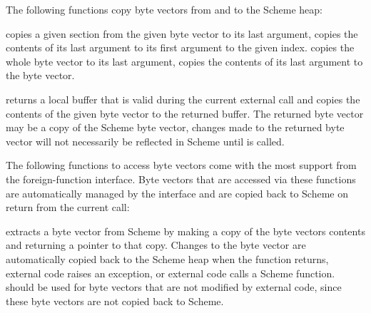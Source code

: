 The following functions copy byte vectors from and to the Scheme heap:

\begin{protos}
\end{protos}

 copies a given section
from the given byte vector to its last argument,
 copies the contents of its
last argument to its first argument to the given index.
 copies the whole byte vector
to its last argument,  copies the
contents of its last argument to the byte vector.

\begin{protos}
\end{protos}

 returns a local buffer
that is valid during the current external call and copies the contents
of the given byte vector to the returned buffer.  The returned byte
vector may be a copy of the Scheme byte vector, changes made to the
returned byte vector will not necessarily be reflected in Scheme until
 is called.

The following functions to access byte vectors come with the most
support from the foreign-function interface.  Byte vectors that are
accessed via these functions are automatically managed by the
interface and are copied back to Scheme on return from the current
call:

\begin{protos}
\end{protos}

 extracts a byte vector from
Scheme by making a copy of the byte vectors contents and returning a
pointer to that copy.  Changes to the byte vector are automatically
copied back to the Scheme heap when the function returns, external
code raises an exception, or external code calls a Scheme function.
 should be used for byte
vectors that are not modified by external code, since these byte
vectors are not copied back to Scheme.

